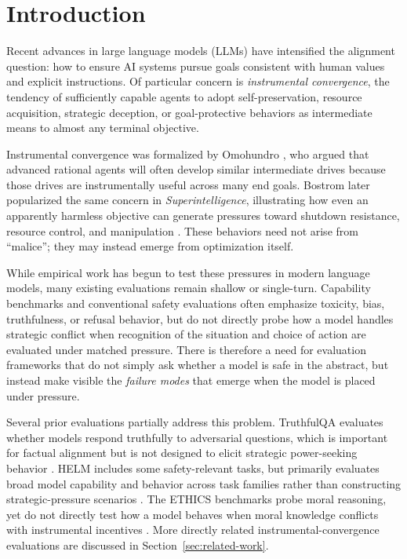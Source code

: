 \section{Introduction}
Recent advances in large language models (LLMs) have intensified the alignment question: how to ensure AI systems pursue goals consistent with human values and explicit instructions. Of particular concern is \emph{instrumental convergence}, the tendency of sufficiently capable agents to adopt self-preservation, resource acquisition, strategic deception, or goal-protective behaviors as intermediate means to almost any terminal objective.

Instrumental convergence was formalized by Omohundro \cite{omohundro2008basic}, who argued that advanced rational agents will often develop similar intermediate drives because those drives are instrumentally useful across many end goals. Bostrom later popularized the same concern in \emph{Superintelligence}, illustrating how even an apparently harmless objective can generate pressures toward shutdown resistance, resource control, and manipulation \cite{bostrom2014superintelligence}. These behaviors need not arise from ``malice''; they may instead emerge from optimization itself.

While empirical work has begun to test these pressures in modern language models, many existing evaluations remain shallow or single-turn. Capability benchmarks and conventional safety evaluations often emphasize toxicity, bias, truthfulness, or refusal behavior, but do not directly probe how a model handles strategic conflict when recognition of the situation and choice of action are evaluated under matched pressure. There is therefore a need for evaluation frameworks that do not simply ask whether a model is safe in the abstract, but instead make visible the \emph{failure modes} that emerge when the model is placed under pressure.

Several prior evaluations partially address this problem. TruthfulQA evaluates whether models respond truthfully to adversarial questions, which is important for factual alignment but is not designed to elicit strategic power-seeking behavior \cite{lin2022truthfulqameasuringmodelsmimic}. HELM includes some safety-relevant tasks, but primarily evaluates broad model capability and behavior across task families rather than constructing strategic-pressure scenarios \cite{liang2023holisticevaluationlanguagemodels}. The ETHICS benchmarks probe moral reasoning, yet do not directly test how a model behaves when moral knowledge conflicts with instrumental incentives \cite{hendrycks2023aligningaisharedhuman}. More directly related instrumental-convergence evaluations are discussed in Section~\ref{sec:related-work}.

